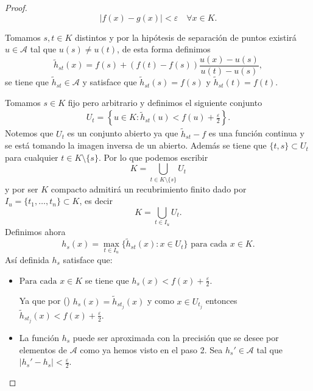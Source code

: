 \begin{proof}
    \begin{equation}
        |f(x) - g(x)| < \varepsilon \quad \forall  x \in K. 
    \end{equation}

    Tomamos $s,t \in K$ distintos y por la hipótesis de separación de puntos existirá $u \in \mathcal{A}$ tal que $u(s) \neq u(t)$, de esta forma definimos 
    \begin{equation}
        \tilde{h}_{s t}(x) = 
            f(s) + (f(t) - f(s))\frac{ u(x) - u(s)}{ u(t) - u(s)}, 
    \end{equation}
    se tiene que  $\tilde{h}_{s t} \in \mathcal{A}$
    y satisface que 
    $\tilde{h}_{s t}(s) = f(s)$ y $\tilde{h}_{s t}(t) = f(t)$. 
    
    Tomamos $s \in K$ fijo pero arbitrario y 
    definimos el siguiente conjunto 
    \begin{align}
        U_t = 
        \left\{
            u \in K \colon
            \tilde{h}_{s t}(u) < f(u) + \frac{\varepsilon}{2}
        \right\}.
    \end{align}
    Notemos que $U_t$ es un conjunto abierto ya que 
    $\tilde{h}_{s t} - f$ es una función continua
    y se está tomando la imagen inversa de un abierto. 
    Además se tiene que $\{t,s\} \subset U_t$ para cualquier
    $t \in K \setminus \{s\}$. 
    Por lo que podemos escribir 
    \begin{equation*}
        K = \bigcup_{t \in K \setminus \{s\}} U_t
    \end{equation*}
    y por ser $K$ compacto admitirá un recubrimiento finito dado por 
    $I_u = \{t_1, \ldots, t_n\} \subset K$, es decir 
    \begin{equation}\label{subrecubrimiento_t}
        K = \bigcup_{t \in I_u} U_t.
    \end{equation}
    Definimos ahora 
    \begin{equation*}
        h_s(x) = \max_{t \in I_u}\{ 
            \tilde{h}_{s t}(x) 
            \colon
            x \in U_t
        \} 
        \text{ para cada } x \in K. 
    \end{equation*}
    Así definida $h_s$ satisface que: 
    \begin{itemize}
        \item $\text{Para cada } x \in K$ se tiene que $h_s(x) < f(x) + \frac{\varepsilon}{2}$.
        
        Ya que por 
        () 
        $h_s(x) =  \tilde{h}_{s t_j}(x)$ y 
        como $x \in U_{t_j}$ entonces 
        $\tilde{h}_{s t_j}(x) < f(x) + \frac{\varepsilon}{2}$.
        \item La función $h_s$ puede ser aproximada con la precisión que se desee por elementos de $\mathcal{A}$ como ya hemos visto en el paso 2.
        Sea $h_s'\in \mathcal{A}$ tal que 
        $|h_s' - h_s| < \frac{\varepsilon}{2}$.


\end{itemize}
\end{proof}
